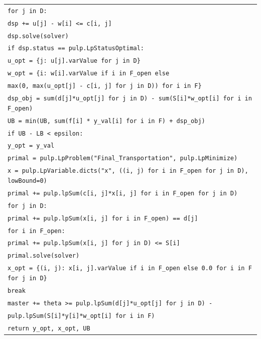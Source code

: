 \begin{table}[H]
\begin{tabular}{p{15cm}}
\texttt{\quad \quad \quad for j in D:} \\
\texttt{\quad \quad \quad \quad dsp += u[j] - w[i] <= c[i, j]} \\
\texttt{\quad \quad dsp.solve(solver)} \\
\texttt{\quad \quad if dsp.status == pulp.LpStatusOptimal:} \\
\texttt{\quad \quad \quad u\_opt = \{j: u[j].varValue for j in D\}} \\
\texttt{\quad \quad \quad w\_opt = \{i: w[i].varValue if i in F\_open else} \\
\texttt{\quad \quad \quad \quad \quad \quad max(0, max(u\_opt[j] - c[i, j] for j in D)) for i in F\}} \\
\texttt{\quad \quad \quad dsp\_obj = sum(d[j]*u\_opt[j] for j in D) - sum(S[i]*w\_opt[i] for i in F\_open)} \\
\texttt{\quad \quad \quad UB = min(UB, sum(f[i] * y\_val[i] for i in F) + dsp\_obj)} \\
\texttt{\quad \quad \quad if UB - LB \textless\ epsilon:} \\
\texttt{\quad \quad \quad \quad y\_opt = y\_val} \\
\texttt{\quad \quad \quad \quad primal = pulp.LpProblem("Final\_Transportation", pulp.LpMinimize)} \\
\texttt{\quad \quad \quad \quad x = pulp.LpVariable.dicts("x", ((i, j) for i in F\_open for j in D), lowBound=0)} \\
\texttt{\quad \quad \quad \quad primal += pulp.lpSum(c[i, j]*x[i, j] for i in F\_open for j in D)} \\
\texttt{\quad \quad \quad \quad for j in D:} \\
\texttt{\quad \quad \quad \quad \quad primal += pulp.lpSum(x[i, j] for i in F\_open) == d[j]} \\
\texttt{\quad \quad \quad \quad for i in F\_open:} \\
\texttt{\quad \quad \quad \quad \quad primal += pulp.lpSum(x[i, j] for j in D) <= S[i]} \\
\texttt{\quad \quad \quad \quad primal.solve(solver)} \\
\texttt{\quad \quad \quad \quad x\_opt = \{(i, j): x[i, j].varValue if i in F\_open else 0.0 for i in F for j in D\}} \\
\texttt{\quad \quad \quad \quad break} \\
\texttt{\quad \quad \quad master += theta >= pulp.lpSum(d[j]*u\_opt[j] for j in D) -} \\
\texttt{\quad \quad \quad \quad \quad \quad \quad \quad pulp.lpSum(S[i]*y[i]*w\_opt[i] for i in F)} \\
\texttt{\quad return y\_opt, x\_opt, UB} \\
\hline
\end{tabular}
\end{table}
